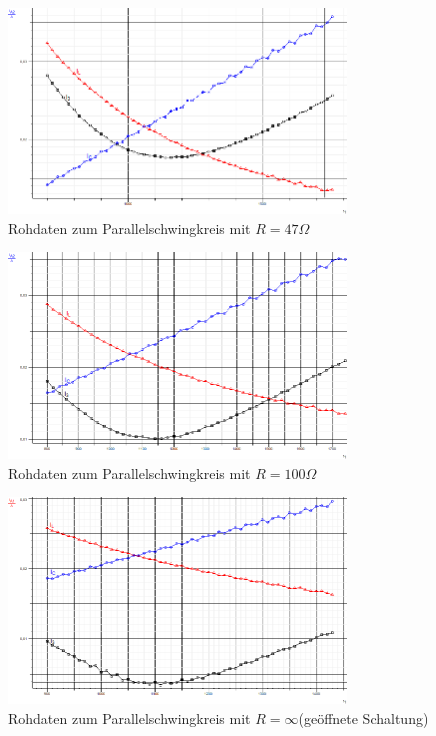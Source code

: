 \documentclass[12pt,a4paper]{article}
\begin{document}
\begin{figure}[H]
	\centering
	\includegraphics[width=0.8\textwidth]{Daten/P47Ohm_Rohdaten_I.png}
	\caption{Rohdaten zum Parallelschwingkreis mit $R=47\Omega$}
	\label{Rohdaten_P47}
\end{figure}
\begin{figure}[H]
	\centering
	\includegraphics[width=0.8\textwidth]{Daten/P100Ohm_Rohdaten_I.png}
	\caption{Rohdaten zum Parallelschwingkreis mit $R=100\Omega$}
	\label{Rohdaten_P100}
\end{figure}
\begin{figure}[H]
	\centering
	\includegraphics[width=0.8\textwidth]{Daten/PinfOhm_Rohdaten_I.png}
	\caption{Rohdaten zum Parallelschwingkreis mit $R=\infty$(geöffnete Schaltung)}
	\label{Rohdaten_Pinf}
\end{figure}
\end{document}
